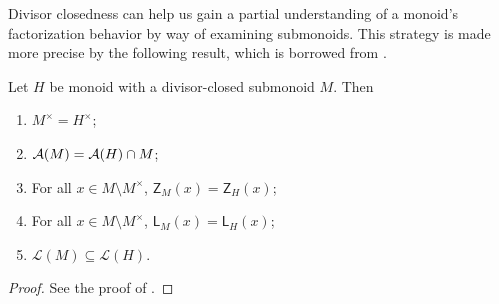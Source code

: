 Divisor closedness can help us gain a partial understanding of a monoid's factorization behavior by way of examining submonoids.
This strategy is made more precise by the following result, which is borrowed from \cite[Proposition 2.21]{fan-tringali18}.
\begin{prop} \label{prop:div closed factorization}
	Let $H$ be monoid with a divisor-closed submonoid $M$.
	Then
	\begin{enumerate}[label={\rm (\roman{*})}]
		\item $M^\times = H^\times$;
		\item $\mathcal{A}(M) = \mathcal{A}(H)\cap M$;
		\item For all $x\in M\setminus M^\times$, $\mathsf{Z}_M(x) = \mathsf{Z}_H(x)$;
		\item For all $x\in M\setminus M^\times$, $\mathsf{L}_M(x) = \mathsf{L}_H(x)$;
		\item $\mathcal{L}(M)\subseteq \mathcal{L}(H)$.
	\end{enumerate}
\end{prop}

\begin{proof}
	See the proof of \cite[Proposition 2.21]{fan-tringali18}.
\end{proof}

